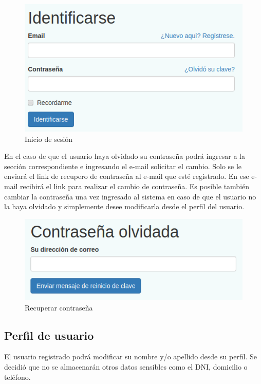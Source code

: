 \documentclass[a4paper]{article}
\begin{document}
\begin{figure}[H]
\centering
\includegraphics[scale=0.4]{Imagenes/iniciar_sesion.png}\par
\caption{Inicio de sesión}
\end{figure}

En el caso de que el usuario haya olvidado su contraseña podrá ingresar a la sección correspondiente e ingresando el e-mail solicitar el cambio. Solo se le enviará el link de recupero de contraseña al e-mail que esté registrado. En ese e-mail recibirá el link para realizar el cambio de contraseña.
Es posible también cambiar la contraseña una vez ingresado al sistema en caso de que el usuario no la haya olvidado y simplemente desee modificarla desde el perfil del usuario.

\begin{figure}[H]
\centering
\includegraphics[scale=0.4]{Imagenes/olvido_clave.png}\par
\caption{Recuperar contraseña}
\end{figure}

\subsection{Perfil de usuario}

El usuario registrado podrá modificar su nombre y/o apellido desde su perfil. Se decidió que no se almacenarán otros datos sensibles como el DNI, domicilio o teléfono.\newline
\end{document}
